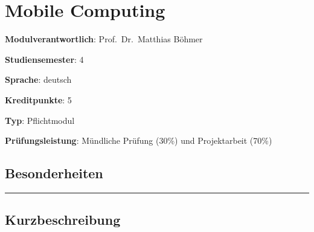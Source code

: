 \hypertarget{mobile-computingpathlabel....srcmodulbeschreibungen-bachelor-bpo5ba_mobile-computing}{%
\chapter{Mobile
Computing\label{../../src/modulbeschreibungen-bachelor-bpo5/BA_Mobile-Computing}}\label{mobile-computingpathlabel....srcmodulbeschreibungen-bachelor-bpo5ba_mobile-computing}}

\begin{modulHead}
\textbf{Modulverantwortlich}: Prof.~Dr.~Matthias
Böhmer
\end{modulHead}
\begin{modulHead}
\textbf{Studiensemester}:
4
\end{modulHead}
\begin{modulHead}
\textbf{Sprache}:
deutsch
\end{modulHead}
\begin{modulHead}
\textbf{Kreditpunkte}:
5
\end{modulHead}
\begin{modulHead}
\textbf{Typ}:
Pflichtmodul
\end{modulHead}
\begin{modulHead}
\textbf{Prüfungsleistung}:
Mündliche Prüfung (30\%) und Projektarbeit (70\%)
\end{modulHead}


\hypertarget{besonderheitenpathlabel....srcmodulbeschreibungen-bachelor-bpo5ba_mobile-computing}{%
\section*{Besonderheiten\label{../../src/modulbeschreibungen-bachelor-bpo5/BA_Mobile-Computing}}\label{besonderheitenpathlabel....srcmodulbeschreibungen-bachelor-bpo5ba_mobile-computing}}

\begin{center}\rule{0.5\linewidth}{0.5pt}\end{center}

\hypertarget{kurzbeschreibungpathlabel....srcmodulbeschreibungen-bachelor-bpo5ba_mobile-computing}{%
\section*{Kurzbeschreibung\label{../../src/modulbeschreibungen-bachelor-bpo5/BA_Mobile-Computing}}\label{kurzbeschreibungpathlabel....srcmodulbeschreibungen-bachelor-bpo5ba_mobile-computing}}


